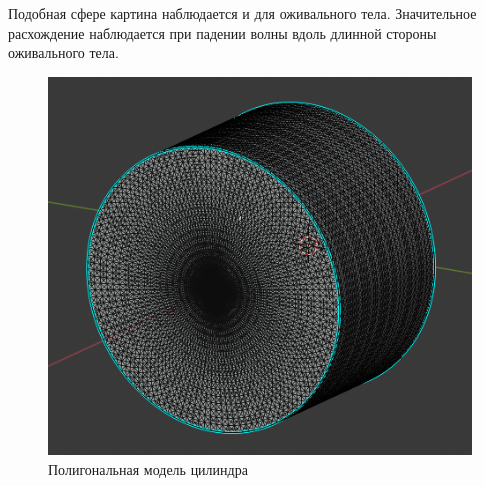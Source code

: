 Подобная сфере картина наблюдается и для оживального тела. Значительное расхождение
наблюдается при падении волны вдоль длинной стороны оживального тела.


\begin{figure}
    \centering
    \includegraphics[width=0.3\linewidth]{Synopsis/images/cylinder_izo}
    \caption{Полигональная модель цилиндра}
    \label{fig:cylinderizo}
\end{figure}

